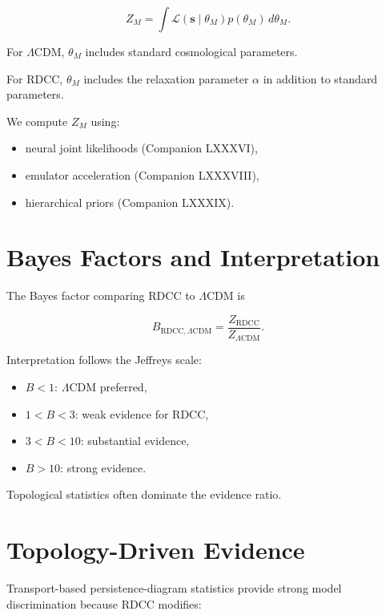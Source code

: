 \documentclass[11pt,a4paper]{article}
\begin{document}
\[
    Z_{M}
    =
    \int
    \mathcal{L}(\mathbf{s} \mid \theta_{M})
    p(\theta_{M})
    \, d\theta_{M}.
\]



For $\Lambda$CDM, $\theta_{M}$ includes standard cosmological parameters.

For RDCC, $\theta_{M}$ includes the relaxation parameter $\alpha$ in addition to 
standard parameters.

We compute $Z_{M}$ using:

\begin{itemize}
    \item neural joint likelihoods (Companion LXXXVI),
    \item emulator acceleration (Companion LXXXVIII),
    \item hierarchical priors (Companion LXXXIX).
\end{itemize}
\section{Bayes Factors and Interpretation}

The Bayes factor comparing RDCC to $\Lambda$CDM is



\[
    B_{\mathrm{RDCC},\Lambda\mathrm{CDM}}
    =
    \frac{Z_{\mathrm{RDCC}}}{Z_{\Lambda\mathrm{CDM}}}.
\]



Interpretation follows the Jeffreys scale:

\begin{itemize}
    \item $B < 1$: $\Lambda$CDM preferred,
    \item $1 < B < 3$: weak evidence for RDCC,
    \item $3 < B < 10$: substantial evidence,
    \item $B > 10$: strong evidence.
\end{itemize}

Topological statistics often dominate the evidence ratio.
\section{Topology-Driven Evidence}

Transport-based persistence-diagram statistics provide strong model 
discrimination because RDCC modifies:
\end{document}
